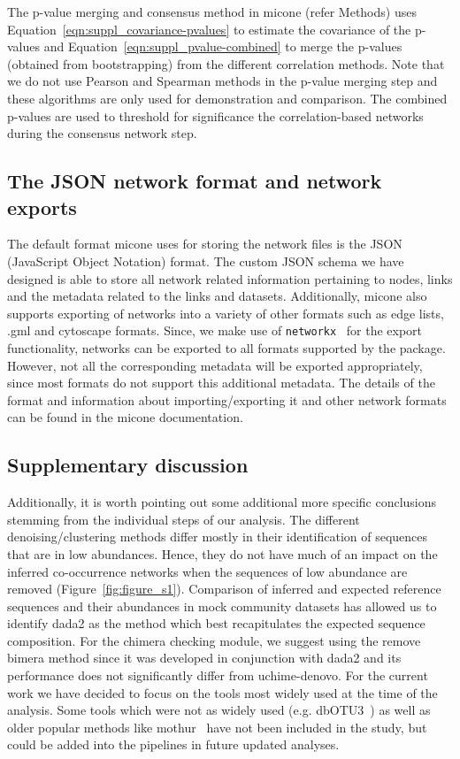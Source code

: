   The p-value merging and consensus method in \ac{micone} (refer Methods) uses Equation~\ref{eqn:suppl_covariance-pvalues} to estimate the covariance of the p-values and Equation~\ref{eqn:suppl_pvalue-combined} to merge the p-values (obtained from bootstrapping) from the different correlation methods.
  Note that we do not use Pearson and Spearman methods in the p-value merging step and these algorithms are only used for demonstration and comparison.
  The combined p-values are used to threshold for significance the correlation-based networks during the consensus network step.

  \subsection*{The JSON network format and network exports}

    The default format \ac{micone} uses for storing the network files is the JSON (JavaScript Object Notation) format.
    The custom JSON schema we have designed is able to store all network related information pertaining to nodes, links and the metadata related to the links and datasets.
    Additionally, \ac{micone} also supports exporting of networks into a variety of other formats such as edge lists, .gml and cytoscape formats.
    Since, we make use of \texttt{networkx}~\cite{hagbergExploringNetworkStructure2008} for the export functionality, networks can be exported to all formats supported by the package.
    However, not all the corresponding metadata will be exported appropriately, since most formats do not support this additional metadata.
    The details of the format and information about importing/exporting it and other network formats can be found in the \ac{micone} documentation.

  \subsection*{Supplementary discussion}

  Additionally, it is worth pointing out some additional more specific conclusions stemming from the individual steps of our analysis.
  The different denoising/clustering methods differ mostly in their identification of sequences that are in low abundances.
  Hence, they do not have much of an impact on the inferred co-occurrence networks when the sequences of low abundance are removed (Figure~\ref{fig:figure_s1}).
  Comparison of inferred and expected reference sequences and their abundances in mock community datasets has allowed us to identify \ac{dada2} as the method which best recapitulates the expected sequence composition.
  For the chimera checking module, we suggest using the remove bimera method since it was developed in conjunction with \ac{dada2} and its performance does not significantly differ from uchime-denovo.
  For the current work we have decided to focus on the tools most widely used at the time of the analysis.
  Some tools which were not as widely used (e.g. dbOTU3~\cite{Olesen2017}) as well as older popular methods like mothur~\cite{Schloss2009} have not been included in the study, but could be added into the pipelines in future updated analyses.

